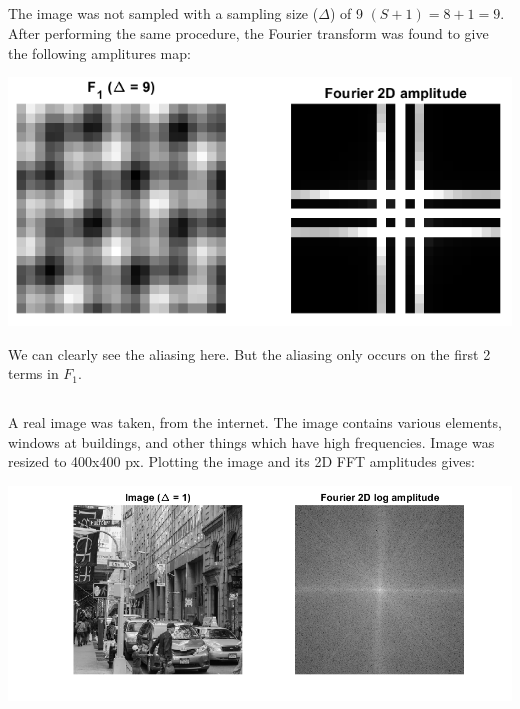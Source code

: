 \documentclass[a4paper]{iacas}
\begin{document}
\subsection{}
The image was not sampled with a sampling size ($\Delta$) of 9 $(S+1) = 8+1 = 9$. After performing the same procedure, the Fourier transform was found to give the following amplitures map:

\vskip 0.1in
\begin{minipage}{0.8\textwidth}
\centering
	\includegraphics[scale=0.7]{imgs/q1_3.png}
\end{minipage}
\vskip 0.1in

We can clearly see the aliasing here. But the aliasing only occurs on the first 2 terms in $F_{1}$. 




\subsection{}
A real image was taken, from the internet. The image contains various elements, windows at buildings, and other things which have high frequencies. Image was resized to 400x400 px. Plotting the image and its 2D FFT amplitudes gives:

\vskip 0.1in
\begin{minipage}{1\textwidth}
\centering
	\includegraphics[scale=0.7]{imgs/q1_5.png}
\end{minipage}
\vskip 0.1in
\end{document}
